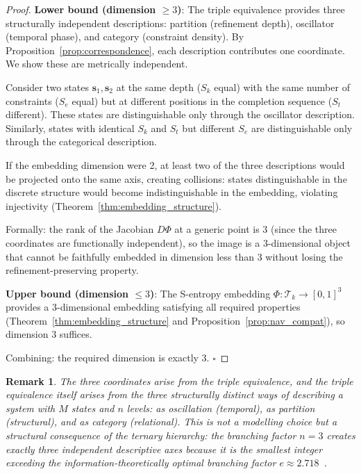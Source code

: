 \documentclass[12pt,twocolumn]{article}
\newtheorem{remark}{Remark}[section]
\begin{document}
\begin{proof}
\textbf{Lower bound (dimension $\geq 3$)}: The triple equivalence provides three structurally independent descriptions: partition (refinement depth), oscillator (temporal phase), and category (constraint density). By Proposition~\ref{prop:correspondence}, each description contributes one coordinate. We show these are metrically independent.

Consider two states $\mathbf{s}_1, \mathbf{s}_2$ at the same depth ($S_k$ equal) with the same number of constraints ($S_e$ equal) but at different positions in the completion sequence ($S_t$ different). These states are distinguishable only through the oscillator description. Similarly, states with identical $S_k$ and $S_t$ but different $S_e$ are distinguishable only through the categorical description.

If the embedding dimension were 2, at least two of the three descriptions would be projected onto the same axis, creating collisions: states distinguishable in the discrete structure would become indistinguishable in the embedding, violating injectivity (Theorem~\ref{thm:embedding_structure}).

Formally: the rank of the Jacobian $D\Phi$ at a generic point is 3 (since the three coordinates are functionally independent), so the image is a 3-dimensional object that cannot be faithfully embedded in dimension less than 3 without losing the refinement-preserving property.

\textbf{Upper bound (dimension $\leq 3$)}: The S-entropy embedding $\Phi: \mathcal{T}_k \to [0,1]^3$ provides a 3-dimensional embedding satisfying all required properties (Theorem~\ref{thm:embedding_structure} and Proposition~\ref{prop:nav_compat}), so dimension 3 suffices.

Combining: the required dimension is exactly 3. $\square$
\end{proof}

\begin{remark}
The three coordinates arise from the triple equivalence, and the triple equivalence itself arises from the three structurally distinct ways of describing a system with $M$ states and $n$ levels: as oscillation (temporal), as partition (structural), and as category (relational). This is not a modelling choice but a structural consequence of the ternary hierarchy: the branching factor $n = 3$ creates exactly three independent descriptive axes because it is the smallest integer exceeding the information-theoretically optimal branching factor $e \approx 2.718$~\cite{cover2006elements,cormen2009introduction}.
\end{remark}
\end{document}

